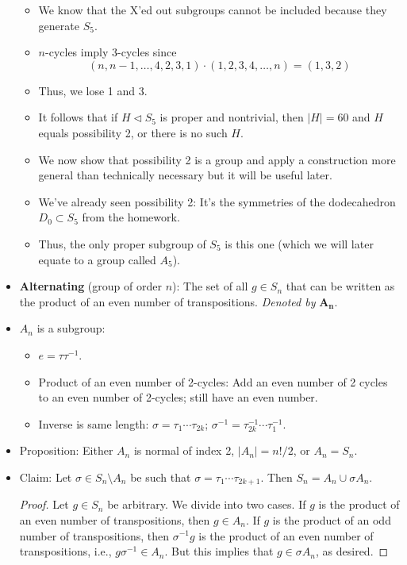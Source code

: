 \documentclass[../notes.tex]{subfiles}
\begin{document}
\begin{itemize}
\begin{itemize}
        \item We know that the X'ed out subgroups cannot be included because they generate $S_5$.
        \item $n$-cycles imply 3-cycles since
        \begin{equation*}
            (n,n-1,\dots,4,2,3,1)\cdot(1,2,3,4,\dots,n) = (1,3,2)
        \end{equation*}
        \item Thus, we lose 1 and 3.
        \item It follows that if $H\triangleleft S_5$ is proper and nontrivial, then $|H|=60$ and $H$ equals possibility 2, or there is no such $H$.
        \item We now show that possibility 2 is a group and apply a construction more general than technically necessary but it will be useful later.
        \item We've already seen possibility 2: It's the symmetries of the dodecahedron $D_0\subset S_5$ from the homework.
        \item Thus, the only proper subgroup of $S_5$ is this one (which we will later equate to a group called $A_5$).
    \end{itemize}
    \item \textbf{Alternating} (group of order $n$): The set of all $g\in S_n$ that can be written as the product of an even number of transpositions. \emph{Denoted by} $\bm{A_n}$.
    \item $A_n$ is a subgroup:
    \begin{itemize}
        \item $e=\tau\tau^{-1}$.
        \item Product of an even number of 2-cycles: Add an even number of 2 cycles to an even number of 2-cycles; still have an even number.
        \item Inverse is same length: $\sigma=\tau_1\cdots\tau_{2k}$; $\sigma^{-1}=\tau_{2k}^{-1}\cdots\tau_1^{-1}$.
    \end{itemize}
    \item Proposition: Either $A_n$ is normal of index 2, $|A_n|=n!/2$, or $A_n=S_n$.
    \item Claim: Let $\sigma\in S_n\setminus A_n$ be such that $\sigma=\tau_1\cdots\tau_{2k+1}$. Then $S_n=A_n\cup\sigma A_n$.
    \begin{proof}
        Let $g\in S_n$ be arbitrary. We divide into two cases. If $g$ is the product of an even number of transpositions, then $g\in A_n$. If $g$ is the product of an odd number of transpositions, then $\sigma^{-1}g$ is the product of an even number of transpositions, i.e., $g\sigma^{-1}\in A_n$. But this implies that $g\in\sigma A_n$, as desired.

\end{proof}
\end{itemize}
\end{document}

